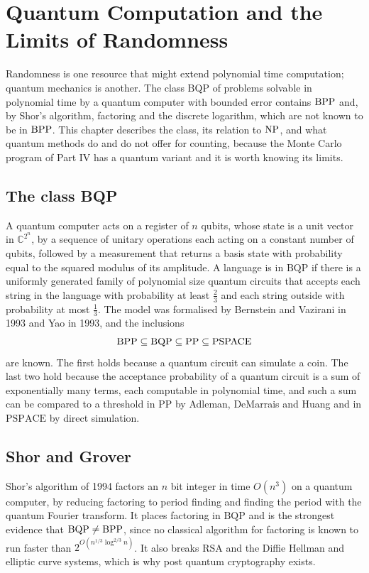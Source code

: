 \chapter{Quantum Computation and the Limits of Randomness}
\label{ch:quantum}

Randomness is one resource that might extend polynomial time computation; quantum mechanics is another. The class $\mathrm{BQP}$ of problems solvable in polynomial time by a quantum computer with bounded error contains $\mathrm{BPP}$ and, by Shor's algorithm, factoring and the discrete logarithm, which are not known to be in $\mathrm{BPP}$. This chapter describes the class, its relation to $\mathrm{NP}$, and what quantum methods do and do not offer for counting, because the Monte Carlo program of Part IV has a quantum variant and it is worth knowing its limits.

\section{The class BQP}

A quantum computer acts on a register of $n$ qubits, whose state is a unit vector in $\mathbb{C}^{2^n}$, by a sequence of unitary operations each acting on a constant number of qubits, followed by a measurement that returns a basis state with probability equal to the squared modulus of its amplitude. A language is in $\mathrm{BQP}$ if there is a uniformly generated family of polynomial size quantum circuits that accepts each string in the language with probability at least $\tfrac23$ and each string outside with probability at most $\tfrac13$. The model was formalised by Bernstein and Vazirani in 1993 and Yao in 1993, and the inclusions
\[
\BPP\index{BPP} \subseteq \mathrm{BQP} \subseteq \mathrm{PP} \subseteq \mathrm{PSPACE}
\]
are known. The first holds because a quantum circuit can simulate a coin. The last two hold because the acceptance probability of a quantum circuit is a sum of exponentially many terms, each computable in polynomial time, and such a sum can be compared to a threshold in $\mathrm{PP}$ by Adleman, DeMarrais and Huang and in $\mathrm{PSPACE}$ by direct simulation.

\section{Shor and Grover}

Shor's algorithm of 1994 factors an $n$ bit integer in time $O(n^3)$ on a quantum computer, by reducing factoring to period finding and finding the period with the quantum Fourier transform. It places factoring in $\mathrm{BQP}$ and is the strongest evidence that $\mathrm{BQP} \neq \mathrm{BPP}$, since no classical algorithm for factoring is known to run faster than $2^{O(n^{1/3} \log^{2/3} n)}$. It also breaks RSA and the Diffie Hellman and elliptic curve systems, which is why post quantum cryptography exists.

